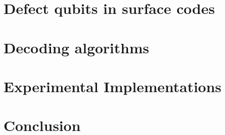 \documentclass[conference]{IEEEtran}
\begin{document}
\section{Defect qubits in surface codes}


\section{Decoding algorithms}


\section{Experimental Implementations}


\section{Conclusion}


\pagebreak
\printbibliography
\end{document}
